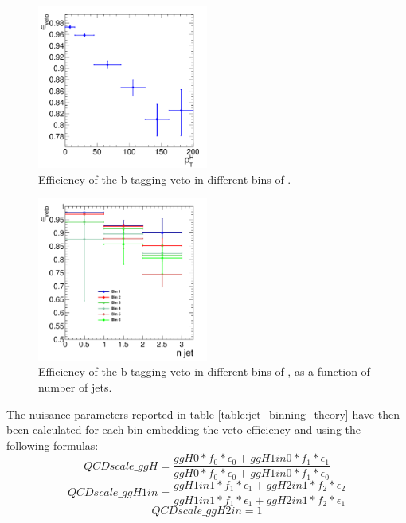 \begin{figure}[htb]
\centering
\includegraphics[width=0.5\textwidth]{images/eff_vs_pth.pdf}
\caption{Efficiency of the b-tagging veto in different bins of \pth.\label{fig:veto_eff_pth}}
\end{figure}
\begin{figure}[htb]
\centering
\includegraphics[width=0.5\textwidth]{images/eff_vs_jet.pdf}
\caption{Efficiency of the b-tagging veto in different bins of \pth, as a function of number of jets.\label{fig:veto_eff_njet}}
\end{figure}

The nuisance parameters reported in table \ref{table:jet_binning_theory} have then been calculated for each \pth bin embedding the veto efficiency and using the following formulas:
\begin{equation}
QCDscale\_ggH=\frac{ggH0*f_{0}*\epsilon_{0}+ggH1in0*f_{1}*\epsilon_{1}}{ggH0*f_{0}*\epsilon_{0}+ggH1in0*f_{1}*\epsilon_{0}}
\end{equation}
\begin{equation}
QCDscale\_ggH1in=\frac{ggH1in1*f_{1}*\epsilon_{1}+ggH2in1*f_{2}*\epsilon_{2}}{ggH1in1*f_{1}*\epsilon_{1}+ggH2in1*f_{2}*\epsilon_{1}}
\end{equation}
\begin{equation}
QCDscale\_ggH2in=1
\end{equation}

